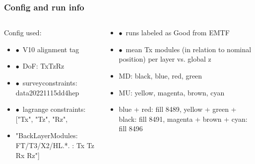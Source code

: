 \documentclass[aspectratio=1610, 12pt]{beamer}
\begin{document}
\begin{frame}\frametitle{Config and run info}
  \begin{columns}
    \begin{column}[c]{0.48\textwidth}
      Config used:
      \begin{itemize}
        \item $\bullet$\, V10 alignment tag
        \item $\bullet$\, DoF: TxTzRz
        \item $\bullet$\, surveyconstraints: data20221115dd4hep
        \item $\bullet$\, lagrange constraints: ["Tx", "Tz", "Rz", 
        \item "BackLayerModules: FT/T3/X2/HL.*. : Tx Tz Rx Rz"]
      \end{itemize}
    \end{column}
    \begin{column}[c]{0.48\textwidth}
      \begin{itemize}
        \item $\bullet$\, runs labeled as Good from EMTF
        \item $\bullet$\, mean Tx modules (in relation to nominal position) per layer vs. global z
        \item MD: black, blue, red, green
        \item MU: yellow, magenta, brown, cyan
        \item blue + red: fill 8489, yellow + green + black: fill 8491, magenta + brown + cyan: fill 8496
      \end{itemize}
    \end{column}
  \end{columns}
\end{frame}
\end{document}

